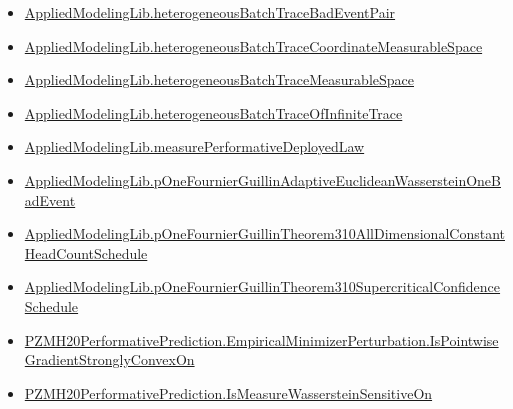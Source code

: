 \documentclass[10pt]{article}
\begin{document}
\begin{itemize}
\item \hyperlink{governing-declaration-68ef005103543934}{Applied\allowbreak{}Modeling\allowbreak{}Lib.\allowbreak{}heterogeneous\allowbreak{}Batch\allowbreak{}Trace\allowbreak{}Bad\allowbreak{}Event\allowbreak{}Pair}
\item \hyperlink{governing-declaration-92d1582063c434f3}{Applied\allowbreak{}Modeling\allowbreak{}Lib.\allowbreak{}heterogeneous\allowbreak{}Batch\allowbreak{}Trace\allowbreak{}Coordinate\allowbreak{}Measurable\allowbreak{}Space}
\item \hyperlink{governing-declaration-caf4e7d2e1526646}{Applied\allowbreak{}Modeling\allowbreak{}Lib.\allowbreak{}heterogeneous\allowbreak{}Batch\allowbreak{}Trace\allowbreak{}Measurable\allowbreak{}Space}
\item \hyperlink{governing-declaration-644c195e65179f85}{Applied\allowbreak{}Modeling\allowbreak{}Lib.\allowbreak{}heterogeneous\allowbreak{}Batch\allowbreak{}Trace\allowbreak{}Of\allowbreak{}Infinite\allowbreak{}Trace}
\item \hyperlink{governing-declaration-7bc25db7b9b1aaf4}{Applied\allowbreak{}Modeling\allowbreak{}Lib.\allowbreak{}measure\allowbreak{}Performative\allowbreak{}Deployed\allowbreak{}Law}
\item \hyperlink{governing-declaration-7aef644371a72bc3}{Applied\allowbreak{}Modeling\allowbreak{}Lib.\allowbreak{}p\allowbreak{}One\allowbreak{}Fournier\allowbreak{}Guillin\allowbreak{}Adaptive\allowbreak{}Euclidean\allowbreak{}Wasserstein\allowbreak{}One\allowbreak{}Bad\allowbreak{}Event}
\item \hyperlink{governing-declaration-2269f56f83ce7a1c}{Applied\allowbreak{}Modeling\allowbreak{}Lib.\allowbreak{}p\allowbreak{}One\allowbreak{}Fournier\allowbreak{}Guillin\allowbreak{}Theorem310\allowbreak{}All\allowbreak{}Dimensional\allowbreak{}Constant\allowbreak{}Head\allowbreak{}Count\allowbreak{}Schedule}
\item \hyperlink{governing-declaration-6a2f3c5b322d78da}{Applied\allowbreak{}Modeling\allowbreak{}Lib.\allowbreak{}p\allowbreak{}One\allowbreak{}Fournier\allowbreak{}Guillin\allowbreak{}Theorem310\allowbreak{}Supercritical\allowbreak{}Confidence\allowbreak{}Schedule}
\item \hyperlink{governing-declaration-9a55381aedc8eead}{PZMH20\allowbreak{}Performative\allowbreak{}Prediction.\allowbreak{}Empirical\allowbreak{}Minimizer\allowbreak{}Perturbation.\allowbreak{}Is\allowbreak{}Pointwise\allowbreak{}Gradient\allowbreak{}Strongly\allowbreak{}Convex\allowbreak{}On}
\item \hyperlink{governing-declaration-0493cb3248e8d4f6}{PZMH20\allowbreak{}Performative\allowbreak{}Prediction.\allowbreak{}Is\allowbreak{}Measure\allowbreak{}Wasserstein\allowbreak{}Sensitive\allowbreak{}On}
\end{itemize}
\end{document}
